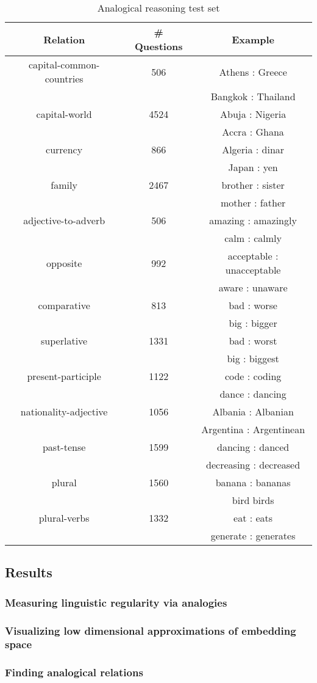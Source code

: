 \begin{table}[h]
	\caption{Analogical reasoning test set}
	\label{table:analogical}
	\centering
    \begin{tabular}{| c |  c | c |}
    \hline
    {\bf Relation} & {\bf \# Questions} & {\bf Example} \\
    \hline
     capital-common-countries & 506 & Athens : Greece \\
     & & Bangkok : Thailand\\
     \hline
    capital-world &   4524  & Abuja : Nigeria \\
    & & Accra : Ghana\\
    \hline
    currency & 866 & Algeria : dinar\\
    & & Japan : yen\\
   \hline
    family & 2467 & brother : sister \\
    & & mother : father\\
    \hline
    adjective-to-adverb & 506 & amazing : amazingly \\
    & & calm : calmly\\
    \hline
    opposite & 992 & acceptable : unacceptable \\
    & & aware : unaware\\
    \hline
    comparative & 813 & bad : worse \\
    & & big : bigger\\
    \hline
    superlative & 1331 & bad : worst \\
    & & big : biggest\\
    \hline
    present-participle & 1122 & code : coding\\
    & & dance : dancing\\
    \hline
    nationality-adjective & 1056 & Albania : Albanian \\
    & & Argentina : Argentinean\\
    \hline
    past-tense & 1599 & dancing : danced \\
    & & decreasing : decreased\\
    \hline
    plural & 1560 & banana : bananas \\
    & & bird birds\\
    \hline
    plural-verbs & 1332 & eat : eats \\
    & & generate : generates\\
    \hline
    \end{tabular}
\end{table}


\subsection{Results}

\subsubsection{Measuring linguistic regularity via analogies}
\subsubsection{Visualizing low dimensional approximations of embedding space}

\subsubsection{Finding analogical relations}
